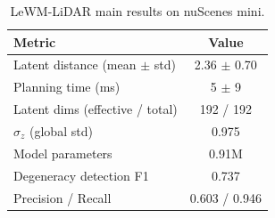 \begin{table}[t]
\centering
\caption{LeWM-LiDAR main results on nuScenes mini.}
\label{tab:main_results}
\begin{tabular}{lc}
\toprule
Metric & Value \\
\midrule
  Latent distance (mean $\pm$ std) & 2.36 $\pm$ 0.70 \\
  Planning time (ms) & 5 $\pm$ 9 \\
\midrule
  Latent dims (effective / total) & 192 / 192 \\
  $\sigma_z$ (global std) & 0.975 \\
  Model parameters & 0.91M \\
\midrule
  Degeneracy detection F1 & 0.737 \\
  Precision / Recall & 0.603 / 0.946 \\
\bottomrule
\end{tabular}
\end{table}
